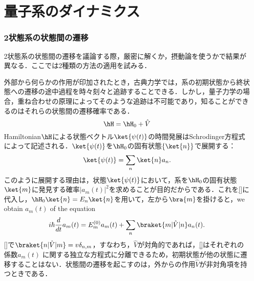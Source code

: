 \part{量子系のダイナミクス}
\section{2状態系の状態間の遷移}
2状態系の状態間の遷移を議論する際，厳密に解くか，摂動論を使うかで結果が異なる．ここでは2種類の方法の適用を試みる．


外部から何らかの作用が印加されたとき，古典力学では，系の初期状態から終状態への遷移の途中過程を時々刻々と追跡することできる．しかし，量子力学の場合，重ね合わせの原理によってそのような追跡は不可能であり，知ることができるのはそれらの状態間の遷移確率である．
\begin{equation}
    \hH=\hH_0+\hat{V}
\end{equation}
Hamiltonian$\hH$による状態ベクトル$\ket{\psi(t)}$の時間発展はSchrodinger方程式によって記述される．$\ket{\psi(t)}$を$\hH_0$の固有状態$\{\ket{n}\}$で展開する：
\begin{equation}
    \ket{\psi(t)}=\sum_{n}\ket{n}a_n.
\end{equation}
このように展開する理由は，状態$\ket{\psi(t)}$において，系を$\hH_0$の固有状態$\ket{m}$に発見する確率$|a_m(t)|^2$を求めることが目的だからである．これを\eqref{}に代入し，$\hH_0\ket{n}=E_n\ket{n}$を用いて，左から$\bra{m}$を掛けると，we obtain $a_m(t)$ of the equation
\begin{equation}
    i\hbar\frac{d}{dt}a_m(t)=E_m^{(0)}a_m(t)+\sum_n\braket{m|\hat{V}|n}a_n(t).
\end{equation}
\eqref{}で$\braket{n|\hat{V}|m}=v\delta_{n,m}$，すなわち，$\hat{V}$が対角的であれば，\eqref{}はそれぞれの係数$a_m(t)$
に関する独立な方程式に分離できるため，初期状態が他の状態に遷移することはない．状態間の遷移を起こすのは，外からの作用$\hat{V}$が非対角項を持つときである．\\

